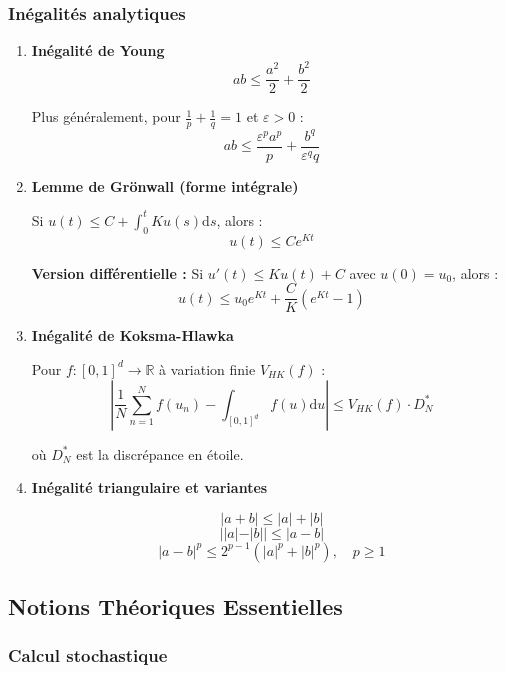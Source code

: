 \documentclass[12pt,a4paper]{article}
\theoremstyle{definition}
\theoremstyle{remark}
\newcommand{\R}{\mathbb{R}}
\newcommand{\dd}{\mathrm{d}}
\begin{document}
\subsubsection{Inégalités analytiques}

\begin{enumerate}
\item \textbf{Inégalité de Young}
\[
ab \leq \frac{a^2}{2} + \frac{b^2}{2}
\]

Plus généralement, pour $\frac{1}{p} + \frac{1}{q} = 1$ et $\varepsilon > 0$ :
\[
ab \leq \frac{\varepsilon^p a^p}{p} + \frac{b^q}{\varepsilon^q q}
\]

\item \textbf{Lemme de Grönwall (forme intégrale)}

Si $u(t) \leq C + \int_0^t K u(s)\dd s$, alors :
\[
u(t) \leq C e^{Kt}
\]

\textbf{Version différentielle :} Si $u'(t) \leq K u(t) + C$ avec $u(0) = u_0$, alors :
\[
u(t) \leq u_0 e^{Kt} + \frac{C}{K}(e^{Kt} - 1)
\]

\item \textbf{Inégalité de Koksma-Hlawka}

Pour $f : [0,1]^d \to \R$ à variation finie $V_{HK}(f)$ :
\[
\left|\frac{1}{N}\sum_{n=1}^N f(u_n) - \int_{[0,1]^d} f(u)\dd u\right| \leq V_{HK}(f) \cdot D_N^*
\]

où $D_N^*$ est la discrépance en étoile.

\item \textbf{Inégalité triangulaire et variantes}

\[
|a + b| \leq |a| + |b|
\]
\[
||a| - |b|| \leq |a - b|
\]
\[
|a - b|^p \leq 2^{p-1}(|a|^p + |b|^p), \quad p \geq 1
\]
\end{enumerate}

\subsection{Notions Théoriques Essentielles}

\subsubsection{Calcul stochastique}
\end{document}
